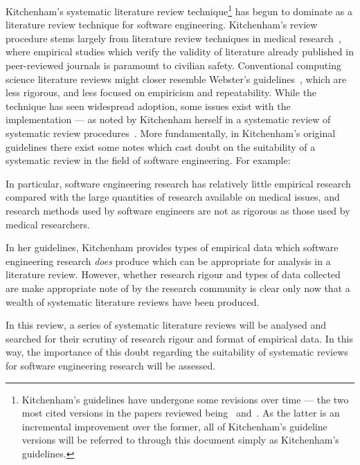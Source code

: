 Kitchenham's systematic literature review technique\footnote{Kitchenham's guidelines have undergone some revisions over time --- the two most cited versions in the papers reviewed being~\cite{Kitchenham2004} and~\cite{Kitchenham2007}. As the latter is an incremental improvement over the former, all of Kitchenham's guideline versions will be referred to through this document simply as Kitchenham's guidelines.} has begun to dominate as a literature review technique for software engineering. Kitchenham's review procedure stems largely from literature review techniques in medical research~\citep{Kitchenham2004, khan2001undertaking}, where empirical studies which verify the validity of literature already published in peer-reviewed journals is paramount to civilian safety. Conventional computing science literature reviews might closer resemble Webster's guidelines~\citep{Webster2002}, which are less rigorous, and less focused on empiricism and repeatability. While the technique has seen widespread adoption, some issues exist with the implementation --- as noted by Kitchenham herself in a systematic review of systematic review procedures~\citep{Kitchenham2013}. More fundamentally, in Kitchenham's original guidelines there exist some notes which cast doubt on the suitability of a systematic review in the field of software engineering. For example:

\begin{displayquote}
    In particular, software engineering research has relatively little empirical research compared with the large quantities of research available on medical issues, and research methods used by software engineers are not as rigorous as those used by medical researchers.
\end{displayquote}

In her guidelines, Kitchenham provides types of empirical data which software engineering research \emph{does} produce which can be appropriate for analysis in a literature review. However, whether research rigour and types of data collected are make appropriate note of by the research community is clear only now that a wealth of systematic literature reviews have been produced.\par

In this review, a series of systematic literature reviews will be analysed and searched for their scrutiny of research rigour and format of empirical data. In this way, the importance of this doubt regarding the suitability of systematic reviews for software engineering research will be assessed.\par

